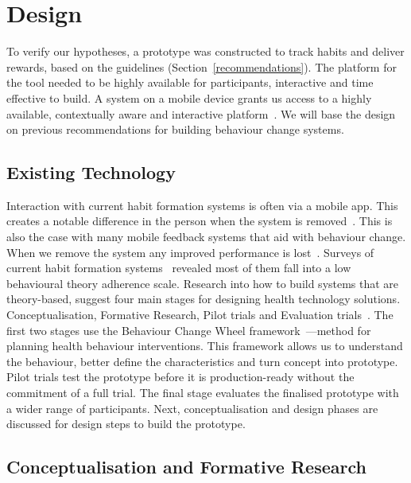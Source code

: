 \newpage
\section{Design}
To verify our hypotheses, a prototype was constructed to track habits and deliver rewards, based on the guidelines (Section~\ref{recommendations}). The platform for the tool needed to be highly available for participants, interactive and time effective to build.
A system on a mobile device grants us access to a highly available, contextually aware and interactive platform~\cite{article_my_phone_is_part_of_my_soul, article_mhealth}. We will base the design on previous recommendations for building behaviour change systems.

\subsection{Existing Technology}
Interaction with current habit formation systems is often via a mobile app. This creates a notable difference in the person when the system is removed~\cite{article_my_phone_is_part_of_my_soul}.
This is also the case with many mobile feedback systems that aid with behaviour change.
When we remove the system any improved performance is lost~\cite{article_dont_kick_habit, article_realtime_feedback_improving_medication_taking}. Surveys of current habit formation systems~\cite{survey_on_apps_2,survey_on_current_apps_of_steel, article_mhealth} revealed most of them fall into a low behavioural theory adherence scale.
Research into how to build systems that are theory-based, suggest four main stages for designing health technology solutions. Conceptualisation, Formative Research,
Pilot trials and Evaluation trials~\cite{article_mhealth}. The first two stages use the Behaviour Change Wheel framework~\cite{article_behaviour_change_wheel}---method for planning health behaviour interventions. This framework allows us to understand the behaviour, better define the characteristics and turn concept into prototype.
Pilot trials test the prototype before it is production-ready without the commitment of a full trial. The final stage evaluates the finalised prototype with a wider range of participants. Next, conceptualisation and design phases are discussed for design steps to build the prototype.

\subsection*{Conceptualisation and Formative Research}

